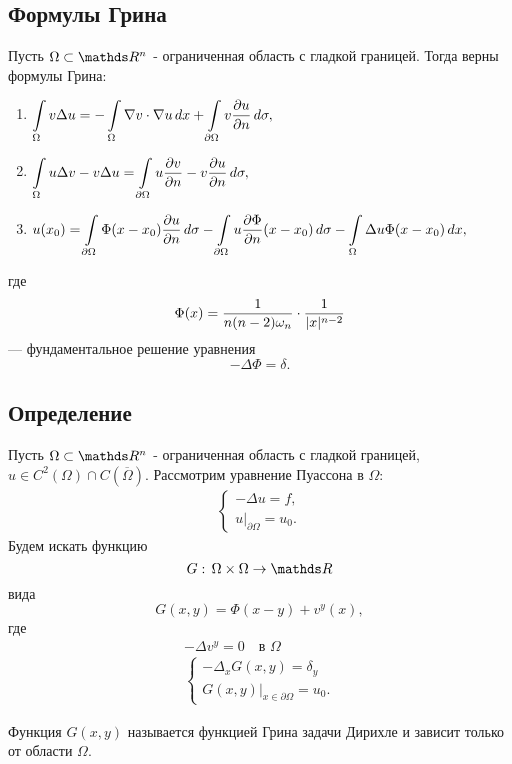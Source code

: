 \subsection{Формулы Грина}
Пусть $\Omega \subset \real^n$ - ограниченная область с гладкой границей. Тогда верны формулы Грина:
\begin{enumerate}
\item $\displaystyle \int \limits_\Omega v \Delta u = - \int \limits_\Omega \nabla v \cdot \nabla u \, dx + \int \limits_{\partial \Omega} v \pder[u]{n} \, d\sigma,$
\item $\displaystyle \int \limits_\Omega u \Delta v - v \Delta u = \int \limits_{\partial \Omega} u \pder[v]{n} - v \pder[u]{n} \, d\sigma,$
\item $\displaystyle u(x_0) = \int \limits_{\partial \Omega} \Phi (x-x_0) \pder[u]{n} \, d\sigma - \int \limits_{\partial \Omega} u \pder[\Phi]{n} (x-x_0) \, d\sigma - \int \limits_\Omega \Delta u \Phi (x - x_0) \, dx,$
\end{enumerate}
где 
$$ \Phi(x) = \frac {1} {n (n-2) \omega_n} \cdot \frac {1} {\abs{x}^{n-2}}$$
--- фундаментальное решение уравнения $$-\Delta \Phi = \delta.$$

\subsection{Определение}
Пусть $\Omega \subset \real^n$ - ограниченная область с гладкой границей, $u \in C^2(\Omega) \cap C(\overline{\Omega})$. Рассмотрим уравнение Пуассона в $\Omega$:
\begin{align*}
	\begin{cases*}
		- \Delta u = f, \\
		u\Big\rvert_{\partial \Omega} = u_0.
	\end{cases*}
\end{align*}
Будем искать функцию
$$G: \, \Omega \times \Omega \rightarrow \real$$ вида
$$G(x,y) = \Phi (x-y) + v^y (x),$$
где
\begin{gather*}
	- \Delta v^y = 0 \quad \text{в $\Omega$} \\
	\begin{cases*}
		- \Delta_x G(x,y) = \delta_y \\
		G(x,y)\Big\rvert_{x \in \partial \Omega} = u_0.
	\end{cases*}
\end{gather*}
\begin{definition}
Функция $G(x,y)$ называется функцией Грина задачи Дирихле и зависит только от области $\Omega$.
\end{definition}

